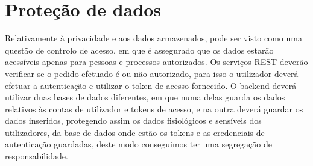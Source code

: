 \section{Proteção de dados}



Relativamente à privacidade e aos dados armazenados, pode ser visto como uma questão de controlo de acesso, em que é assegurado que os dados estarão acessíveis apenas para pessoas e processos autorizados. Os serviços \gls{REST} deverão verificar se o pedido efetuado é ou não autorizado, para isso o utilizador deverá efetuar a autenticação e utilizar o token de acesso fornecido. O backend deverá utilizar duas bases de dados diferentes, em que numa delas guarda os dados relativos às contas de utilizador e tokens de acesso, e na outra deverá guardar os dados inseridos, protegendo assim os dados fisiológicos e sensíveis dos utilizadores, da base de dados onde estão os tokens e as credenciais de autenticação guardadas, deste modo conseguimos ter uma segregação de responsabilidade.

\cleardoublepage